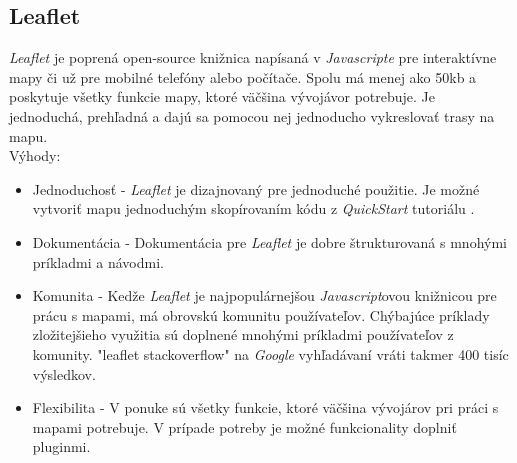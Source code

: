 \subsection{Leaflet \label{section:leaflet}}
\textit{Leaflet} je poprená open-source knižnica napísaná v \textit{Javascripte} pre interaktívne mapy či už pre mobilné telefóny alebo počítače. Spolu má menej ako 50\acrshort{kb} a poskytuje všetky funkcie mapy, ktoré väčšina vývojávor potrebuje\cite{leaflet}. Je jednoduchá, prehľadná a dajú sa pomocou nej jednoducho vykreslovať trasy na mapu.\\
Výhody\cite{leaflet-pros}: 
\begin{itemize}
    \item Jednoduchosť - \textit{Leaflet} je dizajnovaný pre jednoduché použitie. Je možné vytvoriť mapu jednoduchým skopírovaním kódu z \textit{QuickStart} tutoriálu \cite{leaflet-quickstart}.
    \item Dokumentácia - Dokumentácia pre \textit{Leaflet} je dobre štrukturovaná s mnohými príkladmi a návodmi.
    \item Komunita - Kedže \textit{Leaflet} je najpopulárnejšou \textit{Javascript}ovou knižnicou pre prácu s mapami, má obrovskú komunitu používateľov. Chýbajúce príklady zložitejšieho využitia sú doplnené mnohými príkladmi používateľov z komunity. "leaflet stackoverflow" na \textit{Google} vyhľadávaní vráti takmer 400 tisíc výsledkov. 
    \item Flexibilita - V ponuke sú všetky funkcie, ktoré väčšina vývojárov pri práci s mapami potrebuje. V prípade potreby je možné funkcionality doplniť pluginmi.
\end{itemize} 